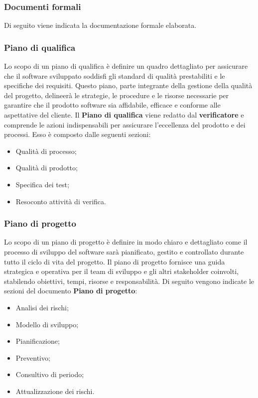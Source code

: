 \documentclass{article}
\begin{document}
\subsubsection{Documenti formali}
Di seguito viene indicata la documentazione formale elaborata.

\subsubsection*{\textbf{Piano di qualifica}}
Lo scopo di un piano di qualifica è definire un quadro dettagliato per assicurare che il software sviluppato soddisfi gli standard di qualità prestabiliti e le specifiche dei requisiti. Questo piano, parte integrante della gestione della qualità del progetto, delineerà le strategie, le procedure e le risorse necessarie per garantire che il prodotto software sia affidabile, efficace e conforme alle aspettative del cliente. Il \textbf{Piano di qualifica} viene redatto dal \textbf{verificatore} e comprende le azioni indispensabili per assicurare l'eccellenza del prodotto e dei processi. Esso è composto dalle seguenti sezioni:\begin{itemize}
    \item Qualità di processo;
    \item Qualità di prodotto;
    \item Specifica dei test;
    \item Resoconto attività di verifica.
\end{itemize}
\subsubsection*{\textbf{Piano di progetto}}
Lo scopo di un piano di progetto è definire in modo chiaro e dettagliato come il processo di sviluppo del software sarà pianificato, gestito e controllato durante tutto il ciclo di vita del progetto. Il piano di progetto fornisce una guida strategica e operativa per il team di sviluppo e gli altri stakeholder coinvolti, stabilendo obiettivi, tempi, risorse e responsabilità. Di seguito vengono indicate le sezioni del documento \textbf{Piano di progetto}:\begin{itemize}
    \item Analisi dei rischi;
    \item Modello di sviluppo;
    \item Pianificazione;
    \item Preventivo;
    \item Consultivo di periodo;
    \item Attualizzazione dei rischi.
\end{itemize}
\end{document}
